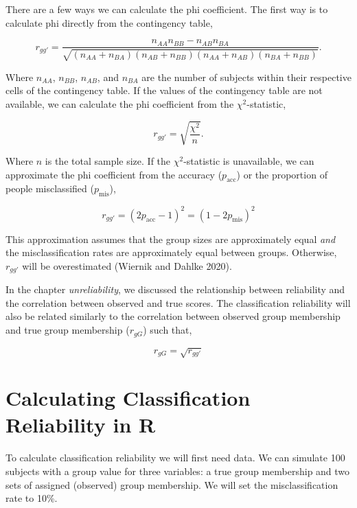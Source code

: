 \documentclass[
  letterpaper,
  DIV=11,
  numbers=noendperiod]{scrreprt}
\begin{document}
There are a few ways we can calculate the phi coefficient. The first way
is to calculate phi directly from the contingency table,

\[
r_{gg'} = \frac{n_{AA}n_{BB}-n_{AB}n_{BA}}{\sqrt{(n_{AA}+n_{BA})(n_{AB}+n_{BB})(n_{AA}+n_{AB})(n_{BA}+n_{BB})}}.
\]

Where \(n_{AA}\), \(n_{BB}\), \(n_{AB}\), and \(n_{BA}\) are the number
of subjects within their respective cells of the contingency table. If
the values of the contingency table are not available, we can calculate
the phi coefficient from the \(\chi^2\)-statistic,

\[
r_{gg'} = \sqrt{\frac{\chi^2}{n}}.
\]

Where \(n\) is the total sample size. If the \(\chi^2\)-statistic is
unavailable, we can approximate the phi coefficient from the accuracy
(\(p_{\text{acc}}\)) or the proportion of people misclassified
(\(p_{\text{mis}}\)),

\[
r_{gg'} = (2p_{\text{acc}}-1)^2 = (1-2p_{\text{mis}})^2
\]

This approximation assumes that the group sizes are approximately equal
\emph{and} the misclassification rates are approximately equal between
groups. Otherwise, \(r_{gg'}\) will be overestimated (Wiernik and Dahlke
2020).

In the chapter \emph{unreliability}, we discussed the relationship
between reliability and the correlation between observed and true
scores. The classification reliability will also be related similarly to
the correlation between observed group membership and true group
membership (\(r_{gG}\)) such that,

\[
r_{gG}=\sqrt{r_{gg'}}
\]

\hypertarget{calculating-classification-reliability-in-r}{%
\section{Calculating Classification Reliability in
R}\label{calculating-classification-reliability-in-r}}

To calculate classification reliability we will first need data. We can
simulate 100 subjects with a group value for three variables: a true
group membership and two sets of assigned (observed) group membership.
We will set the misclassification rate to 10\%.
\end{document}
